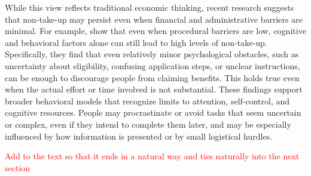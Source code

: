 While this view reflects traditional economic thinking, recent research suggests that non-take-up may persist even when financial and administrative barriers are minimal. For example, \cite{bhargava_psychological_2015} show that even when procedural barriers are low, cognitive and behavioral factors alone can still lead to high levels of non-take-up. Specifically, they find that even relatively minor psychological obstacles, such as uncertainty about eligibility, confusing application steps, or unclear instructions, can be enough to discourage people from claiming benefits. This holds true even when the actual effort or time involved is not substantial. These findings support broader behavioral models that recognize limits to attention, self-control, and cognitive resources. People may procrastinate or avoid tasks that seem uncertain or complex, even if they intend to complete them later, and may be especially influenced by how information is presented or by small logistical hurdles.

\textcolor{red}{Add to the text so that it ends in a natural way and ties naturally into the next section}

